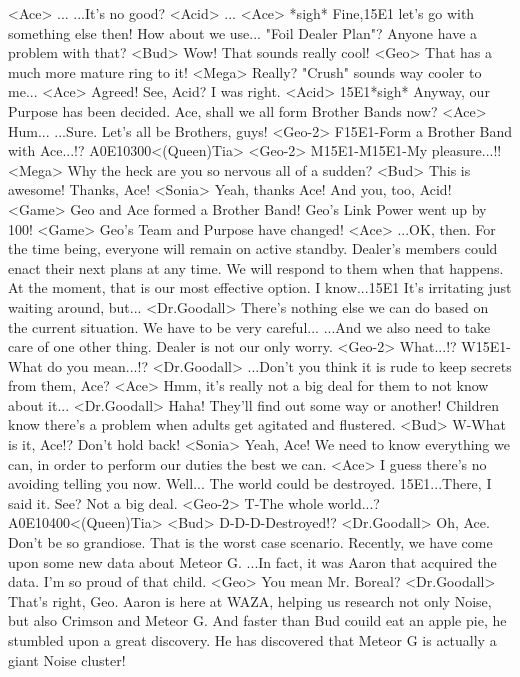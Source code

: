 <Ace> ... 
...It's no good? 
<Acid> ... 
<Ace> *sigh* Fine,{15}{E1} let's go with something else then! 
How about we use... "Foil Dealer Plan"? 
Anyone have a problem with that? 
<Bud> Wow! That sounds really cool! 
<Geo> That has a much more mature ring to it! 
<Mega> Really? "Crush" sounds way cooler to me... 
<Ace> Agreed! 
See, Acid? I was right. 
<Acid> {15}{E1}*sigh* Anyway, our Purpose has been decided. 
Ace, shall we all form Brother Bands now? 
<Ace> Hum... 
...Sure. 
Let's all be Brothers, guys! 
<Geo-2> F{15}{E1}-Form a Brother Band with Ace...!? 
{A0}{E1}{03}{00}<(Queen)Tia> 
<Geo-2> M{15}{E1}-M{15}{E1}-My pleasure...!! 
<Mega> Why the heck are you so nervous all of a sudden? 
<Bud> This is awesome! Thanks, Ace! 
<Sonia> Yeah, thanks Ace! And you, too, Acid! 
<Game> Geo and Ace formed a Brother Band! 
Geo's Link Power went up by 100! 
<Game> Geo's Team and Purpose have changed! 
<Ace> ...OK, then. For the time being, everyone will remain on active standby. 
Dealer's members could enact their next plans at any time. 
We will respond to them when that happens. 
At the moment, that is our most effective option. 
I know...{15}{E1} It's irritating just waiting around, but... 
<Dr.Goodall> There's nothing else we can do based on the current situation. 
We have to be very careful... 
...And we also need to take care of one other thing. 
Dealer is not our only worry. 
<Geo-2> What...!? 
W{15}{E1}-What do you mean...!? 
<Dr.Goodall> ...Don't you think it is rude to keep secrets from them, Ace? 
<Ace> Hmm, it's really not a big deal for them to not know about it... 
<Dr.Goodall> Haha! They'll find out some way or another! 
Children know there's a problem when adults get agitated and flustered. 
<Bud> W-What is it, Ace!? Don't hold back! 
<Sonia> Yeah, Ace! 
We need to know everything we can, in order to perform our duties the best we can. 
<Ace> I guess there's no avoiding telling you now. 
Well... The world could be destroyed. 
{15}{E1}...There, I said it. See? Not a big deal. 
<Geo-2> T-The whole world...? 
{A0}{E1}{04}{00}<(Queen)Tia> 
<Bud> D-D-D-Destroyed!? 
<Dr.Goodall> Oh, Ace. Don't be so grandiose. 
That is the worst case scenario. 
Recently, we have come upon some new data about Meteor G. 
...In fact, it was Aaron that acquired the data. I'm so proud of that child. 
<Geo> You mean Mr. Boreal? 
<Dr.Goodall> That's right, Geo. 
Aaron is here at WAZA, helping us research not only 
Noise, but also Crimson and Meteor G. 
And faster than Bud couild eat an apple pie, he stumbled upon a great discovery. 
He has discovered that Meteor G is actually a giant Noise cluster! 
